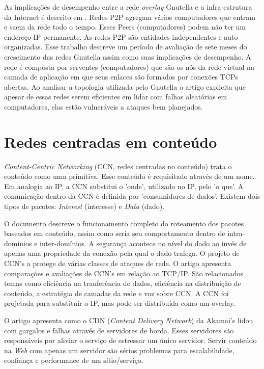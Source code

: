 As implicações de desempenho entre a rede \emph{overlay} Gnutella e a 
infra-estrutura da Internet é descrito em \citep{ripeanu2002mapping}. 
Redes P2P agregam vários computadores que entram e saem da rede todo o tempo. 
Esses Peers (computadores) podem não ter um endereço IP permanente. 
As redes P2P são entidades independentes e auto organizadas. 
Esse trabalho descreve um período de avaliação de sete meses do crescimento das 
redes Gnutella assim como suas implicações de desempenho. 
A rede é composta por serventes (computadores) que são os nós da rede virtual 
na camada de aplicação em que seus enlaces são formados por conexões 
TCPs abertas. 
Ao analisar a topologia utilizada pelo Gnutella o artigo explicita que apesar 
de essas redes serem eficientes em lidar com falhas aleatórias em computadores,
elas estão vulneráveis a ataques bem planejados.

\section{Redes centradas em conteúdo}

\emph{Content-Centric Networking} (CCN, redes centradas no conteúdo) trata o 
conteúdo como uma primitiva\citep{van2009networking}. 
Esse conteúdo é requisitado através de um nome. 
Em analogia ao IP, a CCN substitui o 'onde', utilizado no IP, pelo 'o que'. 
A comunicação dentro da CCN é definida por 'consumidores de dados'. 
Existem dois tipos de pacotes: \emph{Interest} (interesse) 
e \emph{Data} (dado).    

O documento descreve o funcionamento completo do roteamento dos pacotes 
baseados em conteúdo, assim como seria seu comportamento dentro de 
intra-domínios e inter-domínios. 
A segurança acontece no nível do dado ao invés de apenas uma propriedade da 
conexão pela qual o dado trafega. 
O projeto de CCN's a protege de várias classes de ataques de rede. 
O artigo apresenta comparações e avaliações de CCN's em relação ao TCP/IP. 
São relacionados temas como eficiência na tranferência de dados, 
eficiência na distribuição de conteúdo, a estratégia de camadas da rede 
e voz sobre CCN. 
A CCN foi projetada para substituir o IP, mas pode ser distribuída 
como um overlay. 

O artigo \citep{dilley2002globally} apresenta como o CDN 
(\emph{Content Delivery Network}) da Akamai's lidou com gargalos e falhas 
através de servidores de borda. 
Esses servidores são responsáveis por aliviar o serviço de estressar um único 
servidor. 
Servir conteúdo na \emph{Web} com apenas um servidor são sérios problemas 
para escalabilidade, confiança e performance de um sítio/serviço.

